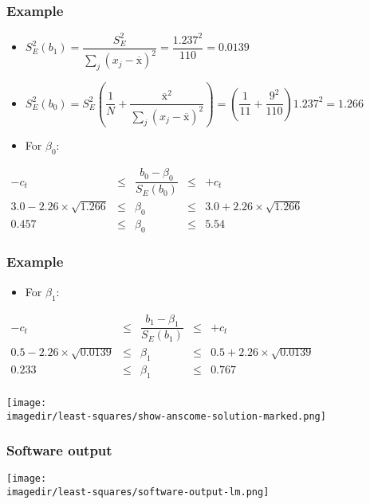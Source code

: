 \begin{frame}\frametitle{Example}
	\begin{itemize}
		\item	$S_E^2(b_1) = \dfrac{S_E^2}{\sum_j{\left( x_j - \overline{\mathrm{x}} \right)^2}} = \dfrac{1.237^2}{110} = 0.0139$ 
		\item	$S_E^2(b_0) = S_E^2 \left(\dfrac{1}{N} + \dfrac{\overline{\mathrm{x}}^2}{\sum_j{\left( x_j - \overline{\mathrm{x}} \right)^2}} \right) = \left(\dfrac{1}{11} + \dfrac{9^2}{110} \right)1.237^2 = 1.266$ 
	\end{itemize}
	\begin{itemize}
		\item	For $\beta_0$: 
	\end{itemize}
	$ 
	\begin{array}{rccclrcccl}
		- c_t &\leq& \dfrac{b_0 - \beta_0}{S_E(b_0)} &\leq & +c_t \\
		3.0 - 2.26 \times \sqrt{1.266} &\leq& \beta_0 &\leq& 3.0 + 2.26 \times \sqrt{1.266} \\
		0.457 &\leq& \beta_0 &\leq& 5.54 
	\end{array}
	$
\end{frame}

\begin{frame}\frametitle{Example}
	\begin{itemize}
		\item	For $\beta_1$: 
	\end{itemize}
	$ 
	\begin{array}{rccclrcccl}
		- c_t &\leq& \dfrac{b_1 - \beta_1}{S_E(b_1)} &\leq & +c_t \\
		0.5 - 2.26 \times \sqrt{0.0139} &\leq& \beta_1 &\leq& 0.5 + 2.26 \times \sqrt{0.0139}\\
		0.233 &\leq& \beta_1 &\leq& 0.767 \\
	\end{array}
	$
	\begin{center}
		\texttt{[image: \\imagedir/least-squares/show-anscome-solution-marked.png]}
	\end{center}
\end{frame}

\begin{frame}\frametitle{Software output}
	\begin{center}
		\texttt{[image: \\imagedir/least-squares/software-output-lm.png]}
	\end{center}
\end{frame}

